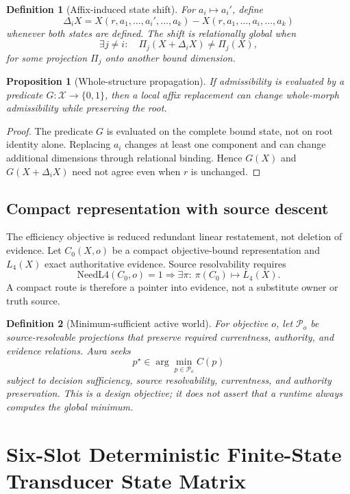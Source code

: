 \documentclass[11pt]{article}
\newtheorem{definition}{Definition}
\newtheorem{proposition}{Proposition}
\begin{document}
\begin{definition}[Affix-induced state shift]
For \(a_i\mapsto a_i'\), define
\[
\Delta_iX=X(r,a_1,\ldots,a_i',\ldots,a_k)-X(r,a_1,\ldots,a_i,\ldots,a_k)
\]
whenever both states are defined. The shift is \emph{relationally global} when
\[
\exists j\neq i:\quad \Pi_j(X+\Delta_iX)\neq\Pi_j(X),
\]
for some projection \(\Pi_j\) onto another bound dimension.
\end{definition}

\begin{proposition}[Whole-structure propagation]
If admissibility is evaluated by a predicate \(G:\mathcal{X}\to\{0,1\}\), then a local affix replacement can change whole-morph admissibility while preserving the root.
\end{proposition}

\begin{proof}
The predicate \(G\) is evaluated on the complete bound state, not on root identity alone. Replacing \(a_i\) changes at least one component and can change additional dimensions through relational binding. Hence \(G(X)\) and \(G(X+\Delta_iX)\) need not agree even when \(r\) is unchanged.
\end{proof}

\subsection{Compact representation with source descent}

The efficiency objective is reduced redundant linear restatement, not deletion of evidence. Let \(C_0(X,o)\) be a compact objective-bound representation and \(L_4(X)\) exact authoritative evidence. Source resolvability requires
\[
\mathrm{NeedL4}(C_0,o)=1
\Longrightarrow
\exists\pi:\ \pi(C_0)\mapsto L_4(X).
\]
A compact route is therefore a pointer into evidence, not a substitute owner or truth source.

\begin{definition}[Minimum-sufficient active world]
For objective \(o\), let \(\mathcal{P}_o\) be source-resolvable projections that preserve required currentness, authority, and evidence relations. Aura seeks
\[
p^\star\in\arg\min_{p\in\mathcal{P}_o}C(p)
\]
subject to decision sufficiency, source resolvability, currentness, and authority preservation. This is a design objective; it does not assert that a runtime always computes the global minimum.
\end{definition}

\section{Six-Slot Deterministic Finite-State Transducer State Matrix}
\end{document}
